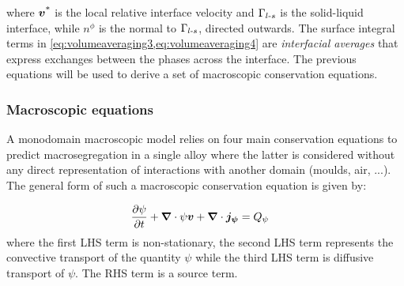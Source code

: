 where $\boldsymbol{v^\text{*}}$ is the local relative interface velocity and $\Gamma_{l\text{-}s}$ is the solid-liquid interface, 
while $n^\phi$ is the normal to $\Gamma_{l\text{-}s}$, directed outwards. The surface integral terms in 
\cref{eq:volumeaveraging3,eq:volumeaveraging4} are \emph{interfacial averages} 
that express exchanges between the phases across the interface. The previous equations will 
be used to derive a set of macroscopic conservation equations. 

\subsubsection{Macroscopic equations}

A monodomain macroscopic model relies on four main conservation equations to predict 
macrosegregation in a single alloy where the latter is considered without any direct representation of interactions with another
domain (moulds, air, ...). 
The general form of such a macroscopic conservation equation is given by:

\begin{align}
\label{eq:conservation_equation_noavg}
& \frac{\partial \psi}{\partial t}  + \boldsymbol{\nabla} \cdot \psi \boldsymbol{v} + \boldsymbol{\nabla} \cdot \boldsymbol{j_{\psi}}
= Q_{\psi}
\end{align}
where the first LHS term is non-stationary, the second LHS term represents the convective transport
of the quantity $\psi$ while the third LHS term is diffusive transport of $\psi$. The RHS
term is a source term.

